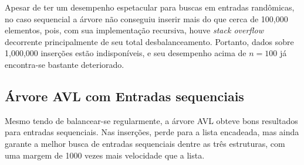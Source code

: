 Apesar de ter um desempenho espetacular para buscas em entradas randômicas, no caso sequencial a árvore não conseguiu inserir mais do que cerca de 100,000 elementos, pois, com sua implementação recursiva, houve \textit{stack overflow} decorrente principalmente de seu total desbalanceamento.
Portanto, dados sobre 1,000,000 inserções estão indisponíveis, e seu desempenho acima de $n = 100$ já encontra-se bastante deteriorado.

\subsection{Árvore AVL com Entradas sequenciais}
Mesmo tendo de balancear-se regularmente, a árvore AVL obteve bons resultados para entradas sequenciais. Nas inserções, perde para a lista encadeada, mas ainda garante a melhor busca de entradas sequenciais dentre as três estruturas, com uma margem de 1000 vezes mais velocidade que a lista.